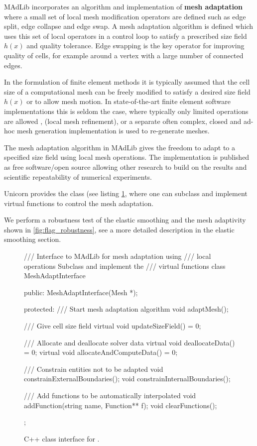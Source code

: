 
MAdLib incorporates an algorithm and implementation of {\bf mesh
adaptation} where a small set of local mesh modification operators
are defined such as edge split, edge collapse and edge swap. A mesh
adaptation algorithm is defined which uses this set of local operators
in a control loop to satisfy a prescribed size field $h(x)$ and quality
tolerance. Edge swapping is the key operator for improving quality of
cells, for example around a vertex with a large number of connected edges.

In the formulation of finite element methods it is typically assumed
that the cell size of a computational mesh can be freely modified
to satisfy a desired size field $h(x)$ or to allow mesh motion. In
state-of-the-art finite element software implementations this
is seldom the case, where typically only limited operations are
allowed \citep{BangerthHartmannKanschat2007, COMSOL2009}, (local
mesh refinement), or a separate often complex, closed and ad-hoc mesh
generation implementation is used to re-generate meshes.

The mesh adaptation algorithm in MAdLib gives the freedom to adapt to a
specified size field using local mesh operations. The implementation is
published as free software/open source allowing other research to build
on the results and scientific repeatability of numerical experiments.

Unicorn provides the  class (see listing
\ref{code:MeshAdaptInterface}, where one can subclass and implement
virtual functions to control the mesh adaptation.

We perform a robustness test of the elastic smoothing and the mesh
adaptivity shown in \ref{fig:flag_robustness}, see a more detailed
description in the elastic smoothing section.

\begin{figure}
\begin{c++}
/// Interface to MAdLib for mesh adaptation using
/// local operations Subclass and implement the
/// virtual functions
class MeshAdaptInterface
{
public:
  MeshAdaptInterface(Mesh *);

protected:
  /// Start mesh adaptation algorithm
  void adaptMesh();

  /// Give cell size field
  virtual void updateSizeField() = 0;

  /// Allocate and deallocate solver data
  virtual void deallocateData() = 0;
  virtual void allocateAndComputeData() = 0;

  /// Constrain entities not to be adapted
  void constrainExternalBoundaries();
  void constrainInternalBoundaries();

  /// Add functions to be automatically interpolated
  void addFunction(string name, Function** f);
  void clearFunctions();
};
\end{c++}
\caption{C++ class interface for .}
\label{code:MeshAdaptInterface}
\end{figure}




